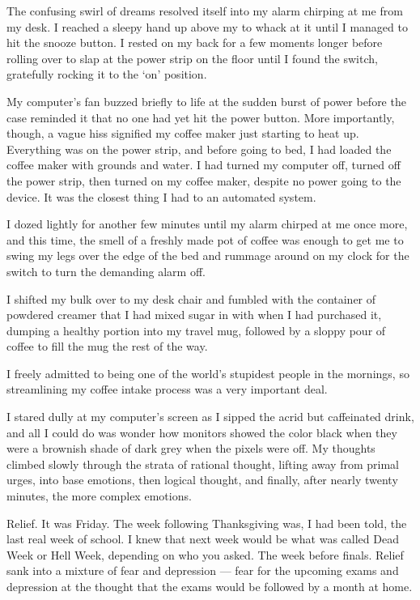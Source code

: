 The confusing swirl of dreams resolved itself into my alarm chirping at me from my desk.  I reached a sleepy hand up above my to whack at it until I managed to hit the snooze button.  I rested on my back for a few moments longer before rolling over to slap at the power strip on the floor until I found the switch, gratefully rocking it to the `on' position.

My computer's fan buzzed briefly to life at the sudden burst of power before the case reminded it that no one had yet hit the power button.  More importantly, though, a vague hiss signified my coffee maker just starting to heat up.  Everything was on the power strip, and before going to bed, I had loaded the coffee maker with grounds and water.  I had turned my computer off, turned off the power strip, then turned on my coffee maker, despite no power going to the device.  It was the closest thing I had to an automated system.

I dozed lightly for another few minutes until my alarm chirped at me once more, and this time, the smell of a freshly made pot of coffee was enough to get me to swing my legs over the edge of the bed and rummage around on my clock for the switch to turn the demanding alarm off.

I shifted my bulk over to my desk chair and fumbled with the container of powdered creamer that I had mixed sugar in with when I had purchased it, dumping a healthy portion into my travel mug, followed by a sloppy pour of coffee to fill the mug the rest of the way.

I freely admitted to being one of the world's stupidest people in the mornings, so streamlining my coffee intake process was a very important deal.

I stared dully at my computer's screen as I sipped the acrid but caffeinated drink, and all I could do was wonder how monitors showed the color black when they were a brownish shade of dark grey when the pixels were off.  My thoughts climbed slowly through the strata of rational thought, lifting away from primal urges, into base emotions, then logical thought, and finally, after nearly twenty minutes, the more complex emotions.  

Relief.  It was Friday.  The week following Thanksgiving was, I had been told, the last real week of school.  I knew that next week would be what was called Dead Week or Hell Week, depending on who you asked.  The week before finals.  Relief sank into a mixture of fear and depression --- fear for the upcoming exams and depression at the thought that the exams would be followed by a month at home.

